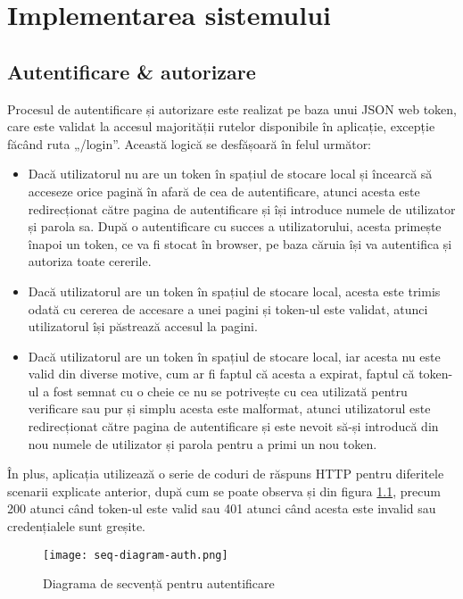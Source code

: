 \chapter{Implementarea sistemului}

\section{Autentificare \& autorizare}\label{4-1}
Procesul de autentificare și autorizare este realizat pe baza unui JSON web token, care este validat la accesul majorității rutelor disponibile în aplicație, excepție făcând ruta „/login”. Această logică se desfășoară în felul următor:

\begin{itemize}

	\item Dacă utilizatorul nu are un token în spațiul de stocare local și încearcă să acceseze orice pagină în afară de cea de autentificare, atunci acesta este redirecționat către pagina de autentificare și își introduce numele de utilizator și parola sa. După o autentificare cu succes a utilizatorului, acesta primește înapoi un token, ce va fi stocat în browser, pe baza căruia își va autentifica și autoriza toate cererile.

	\item Dacă utilizatorul are un token în spațiul de stocare local, acesta este trimis odată cu cererea de accesare a unei pagini și token-ul este validat, atunci utilizatorul își păstrează accesul la pagini.
	
	\item Dacă utilizatorul are un token în spațiul de stocare local, iar acesta nu este valid din diverse motive, cum ar fi faptul că acesta a expirat, faptul că token-ul a fost semnat cu o cheie ce nu se potrivește cu cea utilizată pentru verificare sau pur și simplu acesta este malformat, atunci utilizatorul este redirecționat către pagina de autentificare și este nevoit să-și introducă din nou numele de utilizator și parola pentru a primi un nou token.

\end{itemize}

În plus, aplicația utilizează o serie de coduri de răspuns HTTP pentru diferitele scenarii explicate anterior, după cum se poate observa și din figura \ref{fig:authentication}, precum 200 atunci când token-ul este valid sau 401 atunci când acesta este invalid sau credențialele sunt greșite.

\begin{figure}[H]
	\centering
	\texttt{[image: seq-diagram-auth.png]}
	\caption{Diagrama de secvență pentru autentificare}
	\label{fig:authentication}
\end{figure}

